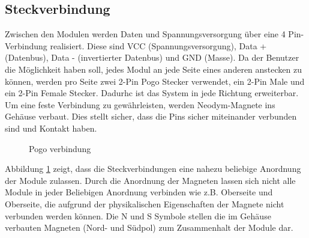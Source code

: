 \subsection{Steckverbindung}
Zwischen den Modulen werden Daten und Spannungsversorgung über eine 4 Pin-Verbindung realisiert. Diese sind VCC (Spannungsversorgung), Data + (Datenbus), Data - (invertierter Datenbus) und GND (Masse). Da der Benutzer die Möglichkeit haben soll, jedes Modul an jede Seite eines anderen anstecken zu können, werden pro Seite zwei 2-Pin Pogo Stecker verwendet, ein 2-Pin Male und ein 2-Pin Female Stecker. Dadurhc ist das System in jede Richtung erweiterbar. Um eine feste Verbindung zu gewährleisten,  werden Neodym-Magnete ins Gehäuse verbaut. Dies stellt sicher, dass die Pins sicher miteinander verbunden sind und Kontakt haben. 
\begin{figure}[H]
    \centering    
    \caption{Pogo verbindung}
    \label{pogo_verbindung}
\end{figure}
 \noindent Abbildung \ref{pogo_verbindung} zeigt, dass die Steckverbindungen eine nahezu beliebige Anordnung der Module zulassen. Durch die Anordnung der Magneten lassen sich nicht alle Module in jeder Beliebigen Anordnung verbinden wie z.B. Oberseite und Oberseite, die aufgrund der physikalischen Eigenschaften der Magnete nicht verbunden werden können. Die \glqq N\grqq{} und \glqq S\grqq{} Symbole stellen die im Gehäuse verbauten Magneten (Nord- und Südpol) zum Zusammenhalt der Module dar.